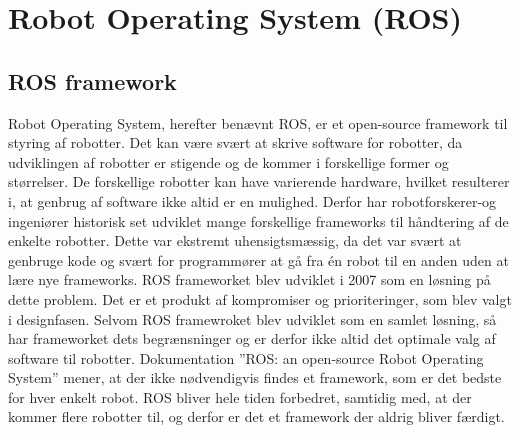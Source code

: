 \chapter{Robot Operating System (ROS)}\label{chap:ROS}
\section{ROS framework}
Robot Operating System, herefter benævnt ROS, er et open-source framework til styring af robotter.
Det kan være svært at skrive software for robotter, da udviklingen af robotter er stigende og de kommer i forskellige former og størrelser.
De forskellige robotter kan have varierende hardware, hvilket resulterer i, at genbrug af software ikke altid er en mulighed.
Derfor har robotforskerer-og ingeniører historisk set udviklet mange forskellige frameworks til håndtering af de enkelte robotter.
Dette var ekstremt uhensigtsmæssig, da det var svært at genbruge kode og svært for programmører at gå fra én robot til en anden uden at lære nye frameworks.
ROS frameworket blev udviklet i 2007 som en løsning på dette problem. Det er et produkt af kompromiser og prioriteringer, som blev valgt i designfasen.
Selvom ROS framewroket blev udviklet som en samlet løsning, så har frameworket dets begrænsninger og er derfor ikke altid det optimale valg af software til robotter.
Dokumentation ''ROS: an open-source Robot Operating System'' mener, at der ikke nødvendigvis findes et framework, som er det bedste for hver enkelt robot.
ROS bliver hele tiden forbedret, samtidig med, at der kommer flere robotter til, og derfor er det et framework der aldrig bliver færdigt.

